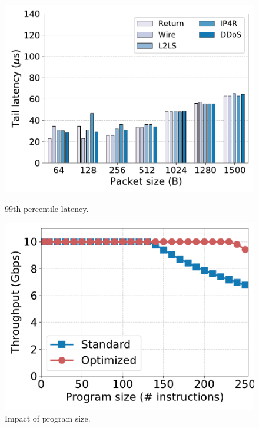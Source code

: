 \begin{figure}[th]
\begin{minipage}[b]{0.3\textwidth}
    \includegraphics[width=1.\textwidth]{figures/taillatency.pdf}
    \caption{99th-percentile latency.}
   \label{fig:taillatency}
 \end{minipage}
 \hspace{0.2cm}
 \begin{minipage}[b]{0.3\textwidth} %
   \includegraphics[width=.98\textwidth]{figures/throughput_prog_size.pdf}
   \caption{Impact of program size.}
   \label{fig:programsize}
 \end{minipage}

\end{figure}

